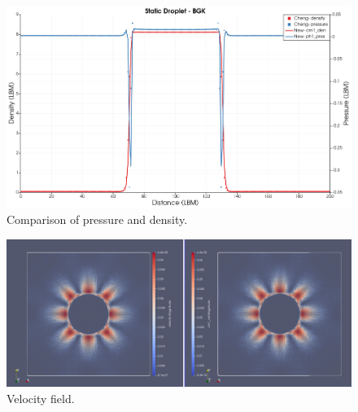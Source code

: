 \documentclass{article}
\begin{document}
	\begin{figure}[h]
		\centering
		\includegraphics[scale=0.3]{pics/BGK_StaticDroplet.png}
		\caption{Comparison of pressure and density.}
		\label{fig:val1CBGK}
	\end{figure}
	\begin{figure}[h]
		\centering
		\includegraphics[scale=0.2]{pics/BGK_StaticDroplet_Vel.png}
		\caption{Velocity field.}
		\label{fig:val1CBGKVel}
	\end{figure}

	
\end{document}

